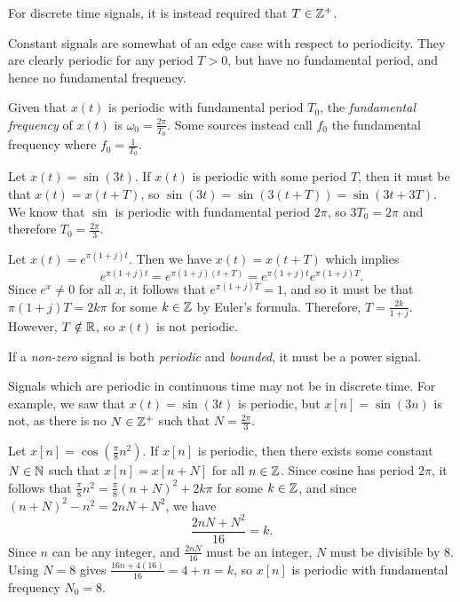\begin{rmk}
    For discrete time signals, it is instead required that $T \in \mathbb{Z}^+$.
\end{rmk}

\begin{rmk}
    Constant signals are somewhat of an edge case with respect to periodicity. They are clearly periodic for any period $T > 0$, but have no fundamental period, and hence no fundamental frequency.
\end{rmk}

\begin{defn}
    Given that $x(t)$ is periodic with fundamental period $T_0$, the \emph{fundamental frequency} of $x(t)$ is $\omega_0 = \frac{2\pi}{T_0}$. Some sources instead call $f_0$ the fundamental frequency where $f_0 = \frac{1}{T_0}$.
\end{defn}

\begin{exmp}
    Let $x(t) = \sin(3t)$. If $x(t)$ is periodic with some period $T$, then it must be that $x(t) = x(t + T)$, so $\sin(3t) = \sin(3(t + T)) = \sin(3t + 3T)$. We know that $\sin$ is periodic with fundamental period $2\pi$, so $3T_0 = 2\pi$ and therefore $T_0 = \frac{2\pi}{3}$.
\end{exmp}

\begin{exmp}
    Let $x(t) = e^{\pi(1 + j)t}$. Then we have $x(t) = x(t + T)$ which implies \[e^{\pi(1 + j)t} = e^{\pi(1 + j)(t + T)} = e^{\pi(1 + j)t}e^{\pi(1 + j)T}.\] Since $e^x \neq 0$ for all $x$, it follows that $e^{\pi(1 + j)T} = 1$, and so it must be that $\pi(1 + j)T = 2k{\pi}$ for some $k \in \mathbb{Z}$ by Euler's formula. Therefore, $T = \frac{2k}{1 + j}$. However, $T \notin \mathbb{R}$, so $x(t)$ is not periodic.
\end{exmp}

\begin{rmk}
    If a \emph{non-zero} signal is both \emph{periodic} and \emph{bounded}, it must be a power signal.
\end{rmk}

\begin{rmk}
    Signals which are periodic in continuous time may not be in discrete time. For example, we saw that $x(t) = \sin(3t)$ is periodic, but $x[n] = \sin(3n)$ is not, as there is no $N \in \mathbb{Z}^+$ such that $N = \frac{2\pi}{3}$.
\end{rmk}

\begin{exmp}
    Let $x[n] = \cos(\frac{\pi}{8}n^2)$. If $x[n]$ is periodic, then there exists some constant $N \in \mathbb{N}$ such that $x[n] = x[n+N]$ for all $n \in \mathbb{Z}$. Since cosine has period $2\pi$, it follows that
    $\frac{\pi}{8}n^2 = \frac{\pi}{8}(n+N)^2 + 2k\pi$ for some $k \in \mathbb{Z}$, and since $(n+N)^2 - n^2 = 2nN + N^2$, we have \[\frac{2nN+N^2}{16} = k.\] Since $n$ can be any integer, and $\frac{2nN}{16}$ must be an integer, $N$ must be divisible by $8$. Using $N = 8$ gives $\frac{16n + 4(16)}{16} = 4 + n = k$, so $x[n]$ is periodic with fundamental frequency $N_0 = 8$.
\end{exmp}

